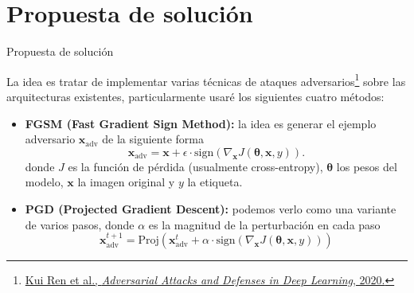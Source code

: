 \documentclass[10pt]{beamer}
\begin{document}
\section{Propuesta de solución}
\begin{frame}{Propuesta de solución}
\justify	
\small

La idea es tratar de implementar varias técnicas de ataques adversarios\footnote{\vspace*{0.3cm} \href{https://reader.elsevier.com/reader/sd/pii/S209580991930503X?token=D051F74ED28FC5C7871D901893E9DAA76D35478F8C374211EC76DA66B1D71487CCB669164F543A5F3A04AE89239AC6C9&originRegion=us-east-1&originCreation=20210425231353}{Kui Ren et al., \emph{Adversarial Attacks and Defenses in Deep Learning}, 2020.}} sobre las arquitecturas existentes, particularmente usaré los siguientes cuatro métodos: 

\begin{itemize}
\item \textbf{FGSM (Fast Gradient Sign Method):} la idea es generar el ejemplo adversario $\bm{x}_{\text{adv}}$ de la siguiente forma
%
\[ \bm{x}_{\text{adv}} = \bm{x} + \epsilon \cdot \text{sign}\left( \nabla_{\bm{x}} J(\bm{\theta}, \bm{x}, y) \right). \]
%
donde $J$ es la función de pérdida (usualmente cross-entropy), $\bm{\theta}$ los pesos del modelo, $\bm{x}$ la imagen original y $y$ la etiqueta.

\item \textbf{PGD (Projected Gradient Descent):} podemos verlo como una variante de varios pasos, donde $\alpha$ es la magnitud de la perturbación en cada paso
%
\[ \bm{x}_{\text{adv}}^{t+1} = \text{Proj}\left( \bm{x}_{\text{adv}}^{t} + \alpha \cdot  \text{sign}\left( \nabla_{\bm{x}} J(\bm{\theta}, \bm{x}, y) \right) \right) \]
\end{itemize}

\end{frame}
\end{document}
